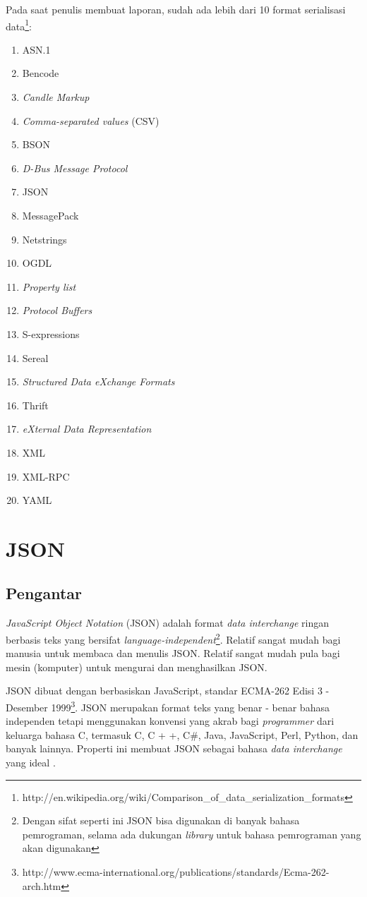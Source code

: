 \documentclass[a4paper, 12pt, oneside]{report}
\begin{document}
\onehalfspacing Pada saat penulis membuat laporan, sudah ada lebih dari 10 format serialisasi data\footnote{http://en.wikipedia.org/wiki/Comparison\_of\_data\_serialization\_formats}:
\begin{enumerate}
  \item ASN.1
  \item Bencode
  \item \textit{Candle Markup}
  \item \textit{Comma-separated values} (CSV)
  \item BSON
  \item \textit{D-Bus Message Protocol}
  \item JSON
  \item MessagePack
  \item Netstrings
  \item OGDL
  \item \textit{Property list}
  \item \textit{Protocol Buffers}
  \item S-expressions
  \item Sereal
  \item \textit{Structured Data eXchange Formats}
  \item Thrift
  \item \textit{eXternal Data Representation}
  \item XML
  \item XML-RPC
  \item YAML
\end{enumerate}

\section{JSON}

\subsection{Pengantar}
\onehalfspacing \textit{JavaScript Object Notation} (JSON) adalah format \textit{data interchange} ringan berbasis teks yang bersifat \textit{language-independent}\footnote{Dengan sifat seperti ini JSON bisa digunakan di banyak bahasa pemrograman, selama ada dukungan \textit{library} untuk bahasa pemrograman yang akan digunakan}. Relatif sangat mudah bagi manusia untuk membaca dan menulis JSON. Relatif sangat mudah pula bagi mesin (komputer) untuk mengurai dan menghasilkan JSON.

\onehalfspacing JSON dibuat dengan berbasiskan JavaScript, standar ECMA-262 Edisi 3 - Desember 1999\footnote{http://www.ecma-international.org/publications/standards/Ecma-262-arch.htm}. JSON merupakan format teks yang benar - benar bahasa independen tetapi menggunakan konvensi yang akrab bagi \textit{programmer} dari keluarga bahasa C, termasuk C, C + +, C\#, Java, JavaScript, Perl, Python, dan banyak lainnya. Properti ini membuat JSON sebagai bahasa \textit{data interchange} yang ideal \cite{introducing-json}.
\end{document}
